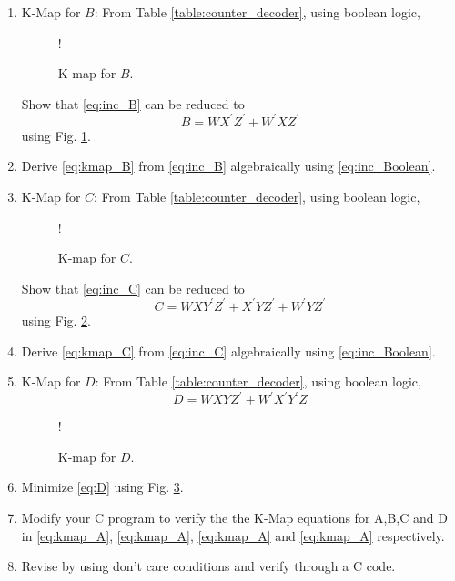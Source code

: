 \begin{enumerate}[label=\thesubsection.\arabic*.,ref=\thesubsection.\theenumi]
\item K-Map for $B$:
From Table \ref{table:counter_decoder}, using boolean logic,
%
\begin{figure}[!h]
\resizebox {\columnwidth} {!} {

}
\caption{K-map for $B$.}
\label{fig:kmap_B}
\end{figure}
%
Show that \eqref{eq:inc_B} can be reduced to
\begin{equation}
\label{eq:kmap_B}
B = WX^{\prime}Z^{\prime} + W^{\prime}XZ^{\prime}
\end{equation}
using Fig. \ref{fig:kmap_B}.
\item Derive \eqref{eq:kmap_B} from \eqref{eq:inc_B} algebraically using \eqref{eq:inc_Boolean}.
%
%
\item {K-Map for $C$: }
From Table \ref{table:counter_decoder}, using boolean logic,
%
%
\begin{figure}[!h]
\resizebox {\columnwidth} {!} {

}
\caption{K-map for $C$.}
\label{fig:kmap_C}
\end{figure}
%
Show that \eqref{eq:inc_C} can be reduced to
\begin{equation}
\label{eq:kmap_C}
C = WXY^{\prime}Z^{\prime}  +  X^{\prime}YZ^{\prime} + W^{\prime}YZ^{\prime}
\end{equation}
using Fig. \ref{fig:kmap_C}.
%
\item 
Derive \eqref{eq:kmap_C} from \eqref{eq:inc_C} algebraically using \eqref{eq:inc_Boolean}.
%
\item {K-Map for $D$: }
From Table \ref{table:counter_decoder}, using boolean logic,
\begin{equation}
\label{eq:D}
D = WXYZ^{\prime} + W^{\prime}X^{\prime}Y^{\prime}Z
\end{equation}
%
\begin{figure}[!h]
\resizebox {\columnwidth} {!} {

}
\caption{K-map for $D$.}
\label{fig:kmap_D}
\end{figure}
%
\item 
Minimize \eqref{eq:D} using Fig. \ref{fig:kmap_D}.
%
\item Modify your C program to verify the 
%
the K-Map equations for A,B,C and D in \eqref{eq:kmap_A}, \eqref{eq:kmap_A}, \eqref{eq:kmap_A}
and \eqref{eq:kmap_A} respectively.
\item Revise by using don't care conditions and verify through a C code.
%
\end{enumerate}
%
%

